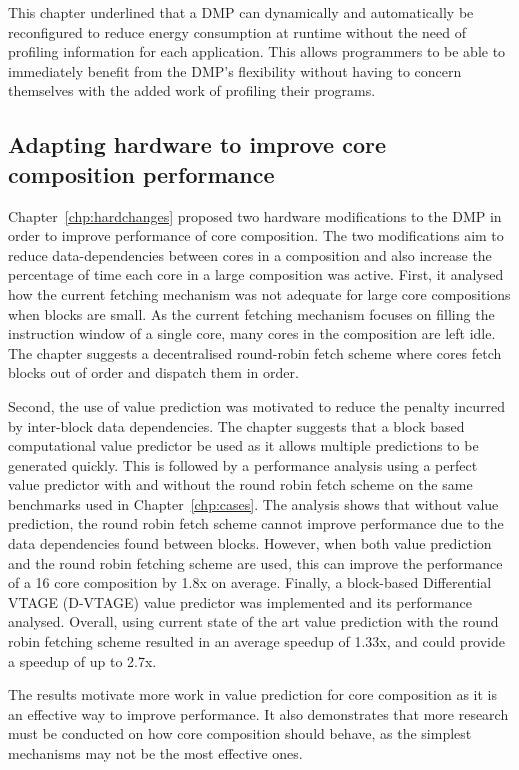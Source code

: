 This chapter underlined that a DMP can dynamically and automatically be reconfigured to reduce energy consumption at runtime without the need of profiling information for each application.
This allows programmers to be able to immediately benefit from the DMP's flexibility without having to concern themselves with the added work of profiling their programs.


\subsection{Adapting hardware to improve core composition performance}
Chapter~\ref{chp:hardchanges} proposed two hardware modifications to the DMP in order to improve performance of core composition.
The two modifications aim to reduce data-dependencies between cores in a composition and also increase the percentage of time each core in a large composition was active.
First, it analysed how the current fetching mechanism was not adequate for large core compositions when blocks are small.
As the current fetching mechanism focuses on filling the instruction window of a single core, many cores in the composition are left idle.
The chapter suggests a decentralised round-robin fetch scheme where cores fetch blocks out of order and dispatch them in order.

Second, the use of value prediction was motivated to reduce the penalty incurred by inter-block data dependencies.
The chapter suggests that a block based computational value predictor be used as it allows multiple predictions to be generated quickly.
This is followed by a performance analysis using a perfect value predictor with and without the round robin fetch scheme on the same benchmarks used in Chapter~\ref{chp:cases}.
The analysis shows that without value prediction, the round robin fetch scheme cannot improve performance due to the data dependencies found between blocks.
However, when both value prediction and the round robin fetching scheme are used, this can improve the performance of a 16 core composition by 1.8x on average.
Finally, a block-based Differential VTAGE (D-VTAGE) value predictor was implemented and its performance analysed.
Overall, using current state of the art value prediction with the round robin fetching scheme resulted in an average speedup of 1.33x, and could provide a speedup of up to 2.7x.

The results motivate more work in value prediction for core composition as it is an effective way to improve performance.
It also demonstrates that more research must be conducted on how core composition should behave, as the simplest mechanisms may not be the most effective ones.


